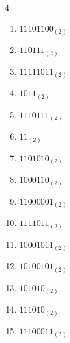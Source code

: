 \begin{multicols}{4}
\begin{enumerate}
        \phantom{$=249$}

  \item $11101100_{(2)}$

        \phantom{$=236$}

\columnbreak %

  \item $110111_{(2)}$

        \phantom{$=55$}

  \item $11111011_{(2)}$

        \phantom{$=251$}

  \item $1011_{(2)}$

        \phantom{$=11$}

  \item $1110111_{(2)}$

        \phantom{$=119$}

  \item $11_{(2)}$

        \phantom{$=3$}

  \item $1101010_{(2)}$

        \phantom{$=106$}

  \item $1000110_{(2)}$

        \phantom{$=70$}

  \item $11000001_{(2)}$

        \phantom{$=193$}

  \item $1111011_{(2)}$

        \phantom{$=123$}

  \item $10001011_{(2)}$

        \phantom{$=139$}

  \item $10100101_{(2)}$

        \phantom{$=165$}

  \item $101010_{(2)}$

        \phantom{$=42$}

  \item $111010_{(2)}$

        \phantom{$=58$}

  \item $11100011_{(2)}$


\end{enumerate}
\end{multicols}
